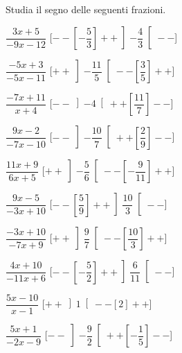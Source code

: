 \begin{esercizio}\label{ese:dis_8}
 Studia il segno delle seguenti frazioni.
\begin{multicols}{2}
 \begin{enumeratea}
  \item  \(\dfrac{3 x +5}{-9 x -12}\) \hfill 
  [\(--\left [-\dfrac{5}{3} \right ]++\left ]-\dfrac{4}{3} \right [--\)]
  \item  \(\dfrac{-5 x +3}{-5 x -11}\) \hfill 
  [\(++\left ]-\dfrac{11}{5} \right [--\left [\dfrac{3}{5} \right ]++\)]
  \item  \(\dfrac{-7 x +11}{x +4}\) \hfill 
  [\(--\left ]-4 \right [++\left [\dfrac{11}{7} \right ]--\)]
  \item  \(\dfrac{9 x -2}{-7 x -10}\) \hfill 
  [\(--\left ]-\dfrac{10}{7} \right [++\left [\dfrac{2}{9} \right ]--\)]
  \item  \(\dfrac{11 x +9}{6 x +5}\) \hfill 
  [\(++\left ]-\dfrac{5}{6} \right [--\left [-\dfrac{9}{11} \right ]++\)]
  \item  \(\dfrac{9 x -5}{-3 x +10}\) \hfill 
  [\(--\left [\dfrac{5}{9} \right ]++\left ]\dfrac{10}{3} \right [--\)]
  \item  \(\dfrac{-3 x +10}{-7 x +9}\) \hfill 
  [\(++\left ]\dfrac{9}{7} \right [--\left [\dfrac{10}{3} \right ]++\)]
  \item  \(\dfrac{4 x +10}{-11 x +6}\) \hfill 
  [\(--\left [-\dfrac{5}{2} \right ]++\left ]\dfrac{6}{11} \right [--\)]
  \item  \(\dfrac{5 x -10}{x -1}\) \hfill 
  [\(++\left ]1 \right [--\left [2 \right ]++\)]
  \item  \(\dfrac{5 x +1}{-2 x -9}\) \hfill 
  [\(--\left ]-\dfrac{9}{2} \right [++\left [-\dfrac{1}{5} \right ]--\)]
 \end{enumeratea}
\end{multicols}
\end{esercizio}

\subsubsection*{}

